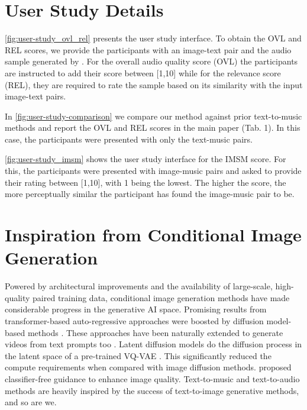  

\section{User Study Details}
\label{sec: more user study}

\cref{fig:user-study_ovl_rel} presents the user study interface. To obtain the OVL and REL scores, we provide the participants with an image-text pair and the audio sample generated by \modelname. For the overall audio quality score (OVL) the participants are instructed to add their score between [1,10] while for the relevance score (REL), they are required to rate the sample based on its similarity with the input image-text pairs. 

In \cref{fig:user-study-comparison} we compare our method against prior text-to-music methods and report the OVL and REL scores in the main paper (Tab. 1). In this case, the participants were presented with only the text-music pairs.

\cref{fig:user-study_imsm} shows the user study interface for the IMSM score. For this, the participants were presented with image-music pairs and asked to provide their rating between [1,10], with 1 being the lowest. The higher the score, the more perceptually similar the participant has found the image-music pair to be.

\section{Inspiration from Conditional Image Generation}
\label{sec: conditional image gen}

Powered by architectural improvements and the availability of large-scale, high-quality paired training data, conditional image generation methods have made considerable progress in the generative AI space. Promising results from transformer-based auto-regressive approaches \cite{yu2022scaling, ramesh2021zero} were boosted by diffusion model-based methods \cite{rombach2022high, saharia2022photorealistic, nichol2021glide}. These approaches have been naturally extended to generate videos from text prompts too \cite{singer2022make, wu2023tune, ho2022imagen}. Latent diffusion models \cite{rombach2022high} do the diffusion process in the latent space of a pre-trained VQ-VAE \cite{van2017neural}. This significantly reduced the compute requirements when compared with image diffusion methods. \citet{classifierfree} proposed classifier-free guidance to enhance image quality.
Text-to-music and text-to-audio methods are heavily inspired by the success of text-to-image generative methods, and so are we.

